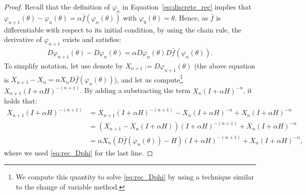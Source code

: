 \documentclass{article}
\begin{document}
\begin{proof}
    Recall that the definition of $\varphi_{n}$ in Equation~\eqref{eq:discrete_rec} implies that $\varphi_{n+1}(\theta) - \varphi_n(\theta) = \alpha\bar{f}(\varphi_n(\theta))$ with $\varphi_0(\theta)=\theta$.  Hence, as $\bar{f}$ is differentiable with respect to its initial condition, by using the chain rule, the derivative of $\varphi_{n+1}$ exists and satisfies:
    \begin{align}
        \label{eq:rec_Dphi}
        D \varphi_{n+1}(\theta) - D \varphi_n(\theta) = \alpha D \varphi_n (\theta) D \bar{f} (\varphi_n(\theta)).
    \end{align}
    To simplify notation, let use denote by $X_{n+1}:=D \varphi_{n+1}(\theta)$ (the above equation is $X_{n+1}-X_n = \alpha X_n D \bar{f} (\varphi_n(\theta))$), and let us compute\footnote{We compute this quantity to solve \eqref{eq:rec_Dphi} by using a technique similar to the change of variable method.} $X_{n+1}(I+\alpha H)^{-(n+1)}$. By adding a substracting the term $X_n(I+\alpha H)^{-n}$, it holds that:
    \begin{align*}
        X_{n+1}(I+\alpha H)^{-(n+1)} &= X_{n+1}(I+\alpha H)^{-(n+1)} - X_{n}(I+\alpha H)^{-n} + X_{n}(I+\alpha H)^{-n}\\
        &= (X_{n+1} - X_{n} (I+\alpha H) )(I+\alpha H)^{-(n+1)} + X_{n}(I+\alpha H)^{-n}\\
        &= \alpha X_{n} (D\bar{f}(\varphi_n(\theta)) - H)(I+\alpha H)^{-(n+1)} + X_{n}(I+\alpha H)^{-n},
    \end{align*}
    where we used \eqref{eq:rec_Dphi} for the last line. 


\end{proof}
\end{document}

